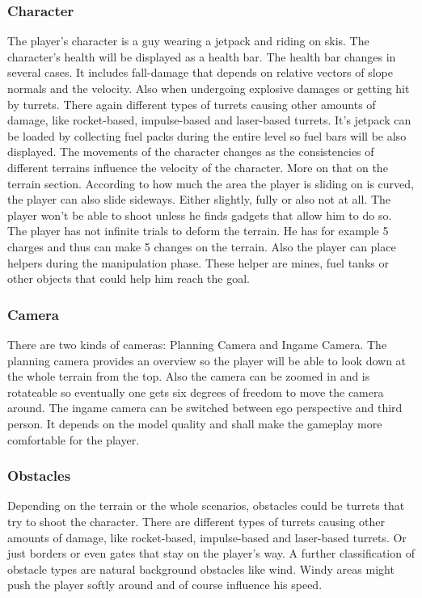 \documentclass[12pt, letterpaper]{scrartcl}
\begin{document}
	\subsubsection{Character}
	The player's character is a guy wearing a jetpack and riding on skis. The character's health will be displayed as a health bar. The health bar changes in several cases. It includes fall-damage that depends on relative vectors of slope normals and the velocity. Also when undergoing explosive damages or getting hit by turrets. There again different types of turrets causing other amounts of damage, like rocket-based, impulse-based and laser-based turrets. It's jetpack can be loaded by collecting fuel packs during the entire level so fuel bars will be also displayed.
	The movements of the character changes as the consistencies of different terrains influence the velocity of the character. More on that on the terrain section.
	According to how much the area the player is sliding on is curved, the player can also slide sideways. Either slightly, fully or also not at all.
	The player won't be able to shoot unless he finds gadgets that allow him to do so.
	The player has not infinite trials to deform the terrain. He has for example 5 charges and thus can make 5 changes on the terrain.
	Also the player can place helpers during the manipulation phase. These helper are mines, fuel tanks or other objects that could help him reach the goal.
	
	\subsubsection{Camera}
	There are two kinds of cameras: Planning Camera and Ingame Camera. The planning camera provides an overview so the player will be able to look down at the whole terrain from the top. Also the camera can be zoomed in and is rotateable so eventually one gets six degrees of freedom to move the camera around.
	The ingame camera can be switched between ego perspective and third person. It depends on the model quality and shall make the gameplay more comfortable for the player.
	
	\subsubsection{Obstacles}
	Depending on the terrain or the whole scenarios, obstacles could be turrets that try to shoot the character. There are different types of turrets causing other amounts of damage, like rocket-based, impulse-based and laser-based turrets. Or just borders or even gates that stay on the player's way. A further classification of obstacle types are natural background obstacles like wind. Windy areas might push the player softly around and of course influence his speed.
	
\end{document}
